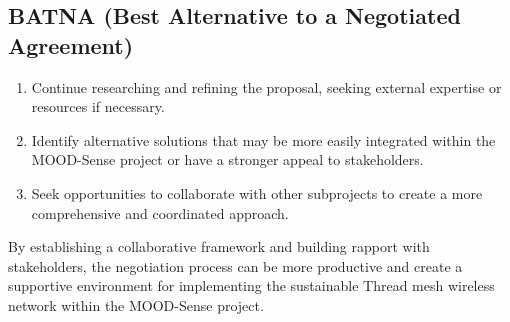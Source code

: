 \subsection*{BATNA (Best Alternative to a Negotiated Agreement)}

\begin{enumerate}
    \item Continue researching and refining the proposal, seeking external expertise or resources if necessary.
    \item Identify alternative solutions that may be more easily integrated within the MOOD-Sense project or have a stronger appeal to stakeholders.
    \item Seek opportunities to collaborate with other subprojects to create a more comprehensive and coordinated approach.
\end{enumerate}

By establishing a collaborative framework and building rapport with stakeholders, the negotiation process can be more productive and create a supportive environment for implementing the sustainable Thread mesh wireless network within the MOOD-Sense project.
